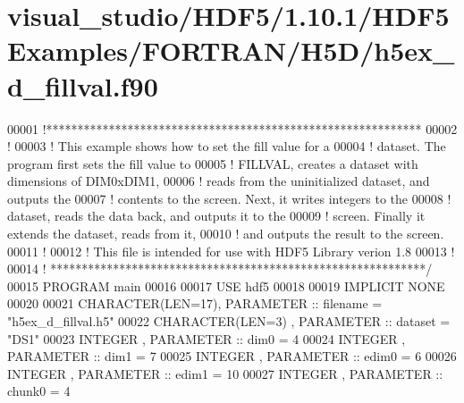 \hypertarget{visual__studio_2_h_d_f5_21_810_81_2_h_d_f5_examples_2_f_o_r_t_r_a_n_2_h5_d_2h5ex__d__fillval_8f90_source}{}\section{visual\+\_\+studio/\+H\+D\+F5/1.10.1/\+H\+D\+F5\+Examples/\+F\+O\+R\+T\+R\+A\+N/\+H5\+D/h5ex\+\_\+d\+\_\+fillval.f90}
\label{visual__studio_2_h_d_f5_21_810_81_2_h_d_f5_examples_2_f_o_r_t_r_a_n_2_h5_d_2h5ex__d__fillval_8f90_source}

\begin{DoxyCode}
00001 \textcolor{comment}{!************************************************************}
00002 \textcolor{comment}{!}
00003 \textcolor{comment}{!  This example shows how to set the fill value for a}
00004 \textcolor{comment}{!  dataset.  The program first sets the fill value to}
00005 \textcolor{comment}{!  FILLVAL, creates a dataset with dimensions of DIM0xDIM1,}
00006 \textcolor{comment}{!  reads from the uninitialized dataset, and outputs the}
00007 \textcolor{comment}{!  contents to the screen.  Next, it writes integers to the}
00008 \textcolor{comment}{!  dataset, reads the data back, and outputs it to the}
00009 \textcolor{comment}{!  screen.  Finally it extends the dataset, reads from it,}
00010 \textcolor{comment}{!  and outputs the result to the screen.}
00011 \textcolor{comment}{!}
00012 \textcolor{comment}{!  This file is intended for use with HDF5 Library verion 1.8}
00013 \textcolor{comment}{!}
00014 \textcolor{comment}{! ************************************************************/}
00015 \textcolor{keyword}{PROGRAM} main
00016 
00017   \textcolor{keywordtype}{USE }hdf5
00018 
00019   \textcolor{keywordtype}{IMPLICIT NONE}
00020 
00021   \textcolor{keywordtype}{CHARACTER(LEN=17)}, \textcolor{keywordtype}{PARAMETER} :: filename = \textcolor{stringliteral}{"h5ex\_d\_fillval.h5"}
00022   \textcolor{keywordtype}{CHARACTER(LEN=3)} , \textcolor{keywordtype}{PARAMETER} :: dataset  = \textcolor{stringliteral}{"DS1"}
00023   \textcolor{keywordtype}{INTEGER}          , \textcolor{keywordtype}{PARAMETER} :: dim0     = 4
00024   \textcolor{keywordtype}{INTEGER}          , \textcolor{keywordtype}{PARAMETER} :: dim1     = 7
00025   \textcolor{keywordtype}{INTEGER}          , \textcolor{keywordtype}{PARAMETER} :: edim0    = 6
00026   \textcolor{keywordtype}{INTEGER}          , \textcolor{keywordtype}{PARAMETER} :: edim1    = 10
00027   \textcolor{keywordtype}{INTEGER}          , \textcolor{keywordtype}{PARAMETER} :: chunk0   = 4

\end{DoxyCode}
